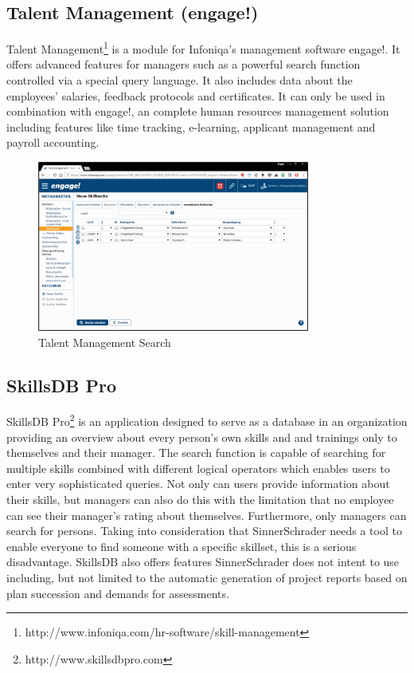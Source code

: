 \subsection{Talent Management (engage!)}
Talent Management\footnote{http://www.infoniqa.com/hr-software/skill-management} is a module for Infoniqa’s management software engage!. It offers advanced features for managers such as a powerful search function controlled via a special query language. It also includes data about the employees’ salaries, feedback protocols and certificates. It can only be used in combination with engage!, an complete human resources management solution including features like time tracking, e-learning, applicant management and payroll accounting.

\begin{figure}[h]
    \centering
    \includegraphics[width=0.8\textwidth]{images/talent_management_-_skillmanagement_-_skillsuche.png}
    \caption{Talent Management Search}
    \label{fig:talent_management}
\end{figure}

\subsection{SkillsDB Pro}
SkillsDB Pro\footnote{http://www.skillsdbpro.com} is an application designed to serve as a database in an organization providing an overview about every person’s own skills and and trainings only to themselves and their manager. The search function is capable of searching for multiple skills combined with different logical operators which enables users to enter very sophisticated queries.
Not only can users provide information about their skills, but managers can also do this with the limitation that no employee can see their manager’s rating about themselves.
Furthermore, only managers can search for persons. Taking into consideration that SinnerSchrader needs a tool to enable everyone to find someone with a specific skillset, this is a serious disadvantage.
SkillsDB also offers features SinnerSchrader does not intent to use including, but not limited to the automatic generation of project reports based on plan succession and demands for assessments.



